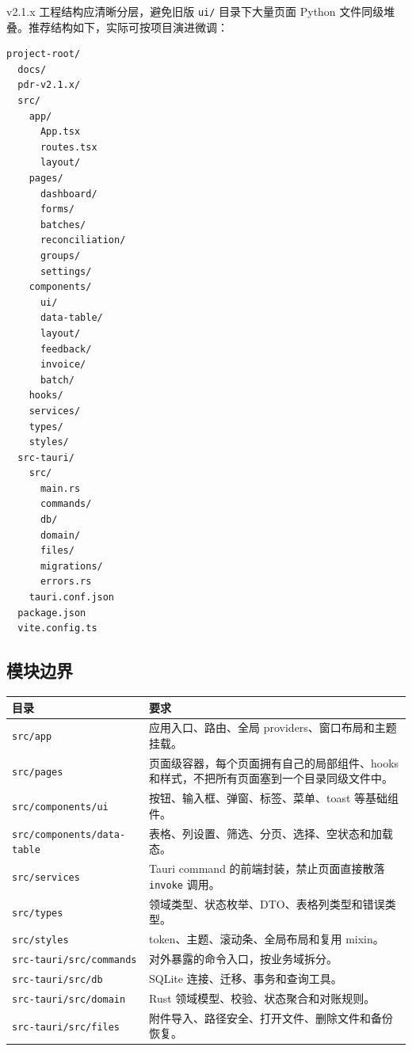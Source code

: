 \documentclass[UTF8,zihao=-4]{ctexart}
\begin{document}
v2.1.x 工程结构应清晰分层，避免旧版 \texttt{ui/} 目录下大量页面 Python 文件同级堆叠。推荐结构如下，实际可按项目演进微调：

\begin{verbatim}
project-root/
  docs/
  pdr-v2.1.x/
  src/
    app/
      App.tsx
      routes.tsx
      layout/
    pages/
      dashboard/
      forms/
      batches/
      reconciliation/
      groups/
      settings/
    components/
      ui/
      data-table/
      layout/
      feedback/
      invoice/
      batch/
    hooks/
    services/
    types/
    styles/
  src-tauri/
    src/
      main.rs
      commands/
      db/
      domain/
      files/
      migrations/
      errors.rs
    tauri.conf.json
  package.json
  vite.config.ts
\end{verbatim}

\subsection{模块边界}

\begin{longtable}{p{4.0cm}p{10.4cm}}
\toprule
目录 & 要求 \\
\midrule
\texttt{src/app} & 应用入口、路由、全局 providers、窗口布局和主题挂载。 \\
\texttt{src/pages} & 页面级容器，每个页面拥有自己的局部组件、hooks 和样式，不把所有页面塞到一个目录同级文件中。 \\
\texttt{src/components/ui} & 按钮、输入框、弹窗、标签、菜单、toast 等基础组件。 \\
\texttt{src/components/data-table} & 表格、列设置、筛选、分页、选择、空状态和加载态。 \\
\texttt{src/services} & Tauri command 的前端封装，禁止页面直接散落 \texttt{invoke} 调用。 \\
\texttt{src/types} & 领域类型、状态枚举、DTO、表格列类型和错误类型。 \\
\texttt{src/styles} & token、主题、滚动条、全局布局和复用 mixin。 \\
\texttt{src-tauri/src/commands} & 对外暴露的命令入口，按业务域拆分。 \\
\texttt{src-tauri/src/db} & SQLite 连接、迁移、事务和查询工具。 \\
\texttt{src-tauri/src/domain} & Rust 领域模型、校验、状态聚合和对账规则。 \\
\texttt{src-tauri/src/files} & 附件导入、路径安全、打开文件、删除文件和备份恢复。 \\
\bottomrule
\end{longtable}
\end{document}
